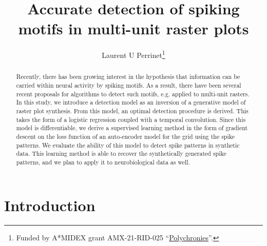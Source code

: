 \documentclass[runningheads]{llncs}
\begin{document}
\title{Accurate detection of spiking motifs in multi-unit raster plots}

\author{Laurent U Perrinet\thanks{Funded by A*MIDEX grant AMX-21-RID-025 ``\href{https://laurentperrinet.github.io/grant/polychronies/}{Polychronies}''.}}
%
%
%
\maketitle              %
%
\begin{abstract} Recently, there has been growing interest in the hypothesis that information can be carried within neural activity by spiking motifs. As a result, there have been several recent proposals for algorithms to detect such motifs, e.g. applied to multi-unit rasters. In this study, we introduce a detection model as an inversion of a generative model of raster plot synthesis. From this model, an optimal detection procedure is derived. This takes the form of a logistic regression coupled with a temporal convolution. Since this model is differentiable, we derive a supervised learning method in the form of gradient descent on the loss function of an auto-encoder model for the grid using the spike patterns. We evaluate the ability of this model to detect spike patterns in synthetic data. This learning method is able to recover the synthetically generated spike patterns, and we plan to apply it to neurobiological data as well.
%
\end{abstract}

\section{Introduction}

\end{document}
